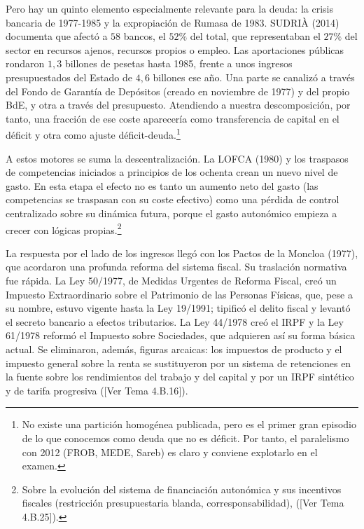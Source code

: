 \documentclass[10pt,a4paper]{article}
\newcommand{\authorfont}[1]{{\fontfamily{EBGaramond-TLF}\selectfont #1}}
\begin{document}
Pero hay un quinto elemento especialmente relevante para la deuda: la crisis bancaria de 1977-1985 y la expropiación de Rumasa de 1983. SUDRIÀ (2014) documenta que afectó a $58$ bancos, el $52\%$ del total, que representaban el $27\%$ del sector en recursos ajenos, recursos propios o empleo. Las aportaciones públicas rondaron $1,3$ billones de pesetas hasta 1985, frente a unos ingresos presupuestados del Estado de $4,6$ billones ese año. Una parte se canalizó a través del Fondo de Garantía de Depósitos (creado en noviembre de 1977) y del propio BdE, y otra a través del presupuesto. Atendiendo a nuestra descomposición, por tanto, una fracción de ese coste aparecería como transferencia de capital en el déficit y otra como ajuste déficit-deuda.\footnote{%
    No existe una partición homogénea publicada, pero es el primer gran episodio de lo que conocemos como deuda que no es déficit. Por tanto, el paralelismo con 2012 (FROB, MEDE, Sareb) es claro y conviene explotarlo en el examen.
} 

A estos motores se suma la descentralización. La LOFCA (1980) y los traspasos de competencias iniciados a principios de los ochenta crean un nuevo nivel de gasto. En esta etapa el efecto no es tanto un aumento neto del gasto (las competencias se traspasan con su coste efectivo) como una pérdida de control centralizado sobre su dinámica futura, porque el gasto autonómico empieza a crecer con lógicas propias.\footnote{%
    Sobre la evolución del sistema de financiación autonómica y sus incentivos fiscales (restricción presupuestaria blanda, corresponsabilidad), ([\authorfont{Ver Tema 4.B.25}]).
}

La respuesta por el lado de los ingresos llegó con los Pactos de la Moncloa (1977), que acordaron una profunda reforma del sistema fiscal. Su traslación normativa fue rápida. La Ley 50/1977, de Medidas Urgentes de Reforma Fiscal, creó un Impuesto Extraordinario sobre el Patrimonio de las Personas Físicas, que, pese a su nombre, estuvo vigente hasta la Ley 19/1991; tipificó el delito fiscal y levantó el secreto bancario a efectos tributarios. La Ley 44/1978 creó el IRPF y la Ley 61/1978 reformó el Impuesto sobre Sociedades, que adquieren así su forma básica actual. Se eliminaron, además, figuras arcaicas: los impuestos de producto y el impuesto general sobre la renta se sustituyeron por un sistema de retenciones en la fuente sobre los rendimientos del trabajo y del capital y por un IRPF sintético y de tarifa progresiva ([\authorfont{Ver Tema 4.B.16}]).
\end{document}
